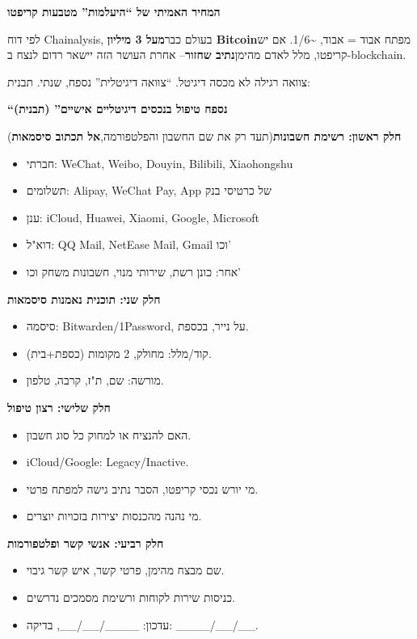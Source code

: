 \textbf{המחיר האמיתי של “היעלמות” מטבעות קריפטו}\par

לפי דוח Chainalysis, בעולם כבר\textbf{מעל 3 מיליון Bitcoin}מפתח אבוד = אבוד, \textasciitilde{}1/6. אם יש קריפטו, מלל לאדם מהימן\textbf{נתיב שחזור}– אחרת העושר הזה יישאר רדום לנצח ב-blockchain.


צוואה רגילה לא מכסה דיגיטל. “צוואה דיגיטלית” נספח, שנתי. תבנית:

\textbf{“נספח טיפול בנכסים דיגיטליים אישיים” (תבנית)}\par

\textbf{חלק ראשון: רשימת חשבונות}(תעד רק את שם החשבון והפלטפורמה,\textbf{אל תכתוב סיסמאות})

\begin{itemize}
  \item חברתי: WeChat, Weibo, Douyin, Bilibili, Xiaohongshu
  \item תשלומים: Alipay, WeChat Pay, App של כרטיסי בנק
  \item ענן: iCloud, Huawei, Xiaomi, Google, Microsoft
  \item דוא"ל: QQ Mail, NetEase Mail, Gmail וכו'
  \item אחר: כונן רשת, שירותי מנוי, חשבונות משחק וכו'
\end{itemize}

\textbf{חלק שני: תוכנית נאמנות סיסמאות}

\begin{itemize}
  \item סיסמה: Bitwarden/1Password, על נייר, בכספת.
  \item קוד/מלל: מחולק, 2 מקומות (כספת+בית).
  \item מורשה: שם, ת"ז, קרבה, טלפון.
\end{itemize}

\textbf{חלק שלישי: רצון טיפול}

\begin{itemize}
  \item האם להנציח או למחוק כל סוג חשבון.
  \item iCloud/Google: Legacy/Inactive.
  \item מי יורש נכסי קריפטו, הסבר נתיב גישה למפתח פרטי.
  \item מי נהנה מהכנסות יצירות בזכויות יוצרים.
\end{itemize}

\textbf{חלק רביעי: אנשי קשר ופלטפורמות}

\begin{itemize}
  \item שם מבצח מהימן, פרטי קשר, איש קשר גיבוי.
  \item כניסות שירות לקוחות ורשימת מסמכים נדרשים.
  \item עדכון: \_\_\_\_/\_\_/\_\_, בדיקה: \_\_\_\_/\_\_/\_\_.
\end{itemize}

